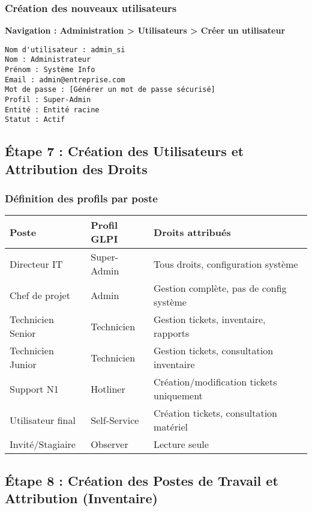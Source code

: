\documentclass[12pt,a4paper]{article}
\begin{document}
\subsubsection{Création des nouveaux utilisateurs}
\textbf{Navigation : Administration > Utilisateurs > Créer un utilisateur}

\begin{lstlisting}[caption=Exemple de création d'utilisateur]
Nom d'utilisateur : admin_si
Nom : Administrateur
Prénom : Système Info
Email : admin@entreprise.com
Mot de passe : [Générer un mot de passe sécurisé]
Profil : Super-Admin
Entité : Entité racine
Statut : Actif
\end{lstlisting}

\subsection{Étape 7 : Création des Utilisateurs et Attribution des Droits}

\subsubsection{Définition des profils par poste}
\begin{center}
\begin{tabular}{|l|l|l|}
\hline
\textbf{Poste} & \textbf{Profil GLPI} & \textbf{Droits attribués} \\
\hline
Directeur IT & Super-Admin & Tous droits, configuration système \\
Chef de projet & Admin & Gestion complète, pas de config système \\
Technicien Senior & Technicien & Gestion tickets, inventaire, rapports \\
Technicien Junior & Technicien & Gestion tickets, consultation inventaire \\
Support N1 & Hotliner & Création/modification tickets uniquement \\
Utilisateur final & Self-Service & Création tickets, consultation matériel \\
Invité/Stagiaire & Observer & Lecture seule \\
\hline
\end{tabular}
\end{center}

\subsection{Étape 8 : Création des Postes de Travail et Attribution (Inventaire)}
\end{document}
